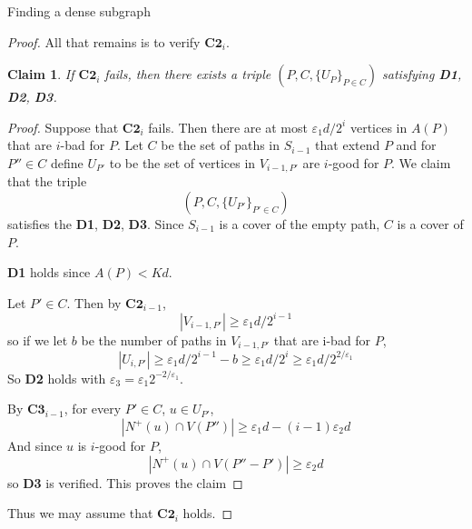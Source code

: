 \documentclass[11pt,a4paper]{article}
\newtheorem{claim}[subsection]{Claim}
\newcommand{\vep}{\varepsilon}
\begin{document}
\begin{section}{Finding a dense subgraph}
\begin{proof}
\bigskip

All that remains is to verify $\textbf{C2}_i$.
\begin{claim} If $\textbf{C2}_i$ fails, then there exists a triple $(P, C, \{U_{P}\}_{P \in C})$ satisfying \textbf{D1}, \textbf{D2}, \textbf{D3}.
\end{claim}
\begin{proof} Suppose that $\textbf{C2}_i$ fails. Then there are at most $\vep_1 d / 2^i$ vertices in $A(P)$ that are $i$-bad for $P$. Let $C$ be the set of paths in $S_{i - 1}$ that extend $P$ and for $P'' \in C$ define $U_{P'}$ to be the set of vertices in $V_{i - 1, P'}$ are $i$-good for $P$.
We claim that the triple
\[
(P, C, \{U_{P'} \}_{P' \in C} )
\]
satisfies the \textbf{D1}, \textbf{D2}, \textbf{D3}. Since $S_{i - 1}$ is a cover of the empty path, $C$ is a cover of $P$.

\medskip

\textbf{D1} holds since $A(P) < Kd$.

\medskip

Let $P' \in C$. Then by $\textbf{C2}_{i-1}$,
\[
|V_{i - 1, P'}| \geq \vep_1 d/2^{i - 1}
\]
so if we let $b$ be the number of paths in $V_{i - 1, P'}$ that are i-bad for $P$,
\[
|U_{i, P'}| \geq \vep_1 d/2^{i - 1} - b \geq \vep_1 d/2^i \geq \vep_1 d / 2^{2/\vep_1}
\]
So \textbf{D2} holds with $\vep_3 = \vep_1 2^{-2/\vep_1}$.

\medskip

By $\textbf{C3}_{i -1}$, for every $P' \in C$, $u \in U_{ P'}$,
\[
|N^+(u) \cap V(P'') | \geq \vep_1 d - (i - 1) \vep_2 d
\]
And since $u$ is $i$-good for $P$,
\[
|N^+(u) \cap V(P'' - P') | \geq \vep_2 d
\]
so \textbf{D3} is verified. This proves the claim
\end{proof}
Thus we may assume that $\textbf{C2}_i$ holds.

\medskip


\end{proof}
\end{section}
\end{document}
